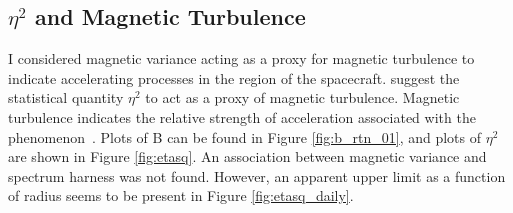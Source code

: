 \documentclass[letterpaper,11pt]{article}
\begin{document}

\subsection{$\eta^2$ and Magnetic Turbulence}
I considered magnetic variance acting as a proxy for magnetic turbulence to indicate accelerating processes in the region of the spacecraft.  \citet{Schwadron1996} suggest the statistical quantity $\eta^2$ to act as a proxy of magnetic turbulence.  Magnetic turbulence indicates the relative strength of acceleration associated with the phenomenon~\citep{Fisk2006}.  Plots of B can be found in Figure \ref{fig:b_rtn_01}, and plots of $\eta^2$ are shown in Figure \ref{fig:etasq}.  An association between magnetic variance and spectrum harness was not found.  However, an apparent upper limit as a function of radius seems to be present in Figure \ref{fig:etasq_daily}.
\end{document}
